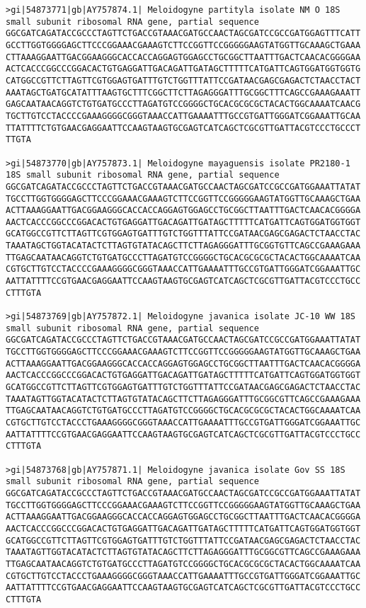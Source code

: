 \documentclass[11pt]{article}
\begin{document}
\begin{Verbatim}[commandchars=\\\{\}]
>gi|54873771|gb|AY757874.1| Meloidogyne partityla isolate NM O 18S small subunit ribosomal RNA gene, partial sequence
GGCGATCAGATACCGCCCTAGTTCTGACCGTAAACGATGCCAACTAGCGATCCGCCGATGGAGTTTCATT
GCCTTGGTGGGGAGCTTCCCGGAAACGAAAGTCTTCCGGTTCCGGGGGAAGTATGGTTGCAAAGCTGAAA
CTTAAAGGAATTGACGGAAGGGCACCACCAGGAGTGGAGCCTGCGGCTTAATTTGACTCAACACGGGGAA
ACTCACCCGGCCCGGACACTGTGAGGATTGACAGATTGATAGCTTTTTCATGATTCAGTGGATGGTGGTG
CATGGCCGTTCTTAGTTCGTGGAGTGATTTGTCTGGTTTATTCCGATAACGAGCGAGACTCTAACCTACT
AAATAGCTGATGCATATTTAAGTGCTTTCGGCTTCTTAGAGGGATTTGCGGCTTTCAGCCGAAAGAAATT
GAGCAATAACAGGTCTGTGATGCCCTTAGATGTCCGGGGCTGCACGCGCGCTACACTGGCAAAATCAACG
TGCTTGTCCTACCCCGAAAGGGGCGGGTAAACCATTGAAAATTTGCCGTGATTGGGATCGGAAATTGCAA
TTATTTTCTGTGAACGAGGAATTCCAAGTAAGTGCGAGTCATCAGCTCGCGTTGATTACGTCCCTGCCCT
TTGTA

>gi|54873770|gb|AY757873.1| Meloidogyne mayaguensis isolate PR2180-1 18S small subunit ribosomal RNA gene, partial sequence
GGCGATCAGATACCGCCCTAGTTCTGACCGTAAACGATGCCAACTAGCGATCCGCCGATGGAAATTATAT
TGCCTTGGTGGGGAGCTTCCCGGAAACGAAAGTCTTCCGGTTCCGGGGGAAGTATGGTTGCAAAGCTGAA
ACTTAAAGGAATTGACGGAAGGGCACCACCAGGAGTGGAGCCTGCGGCTTAATTTGACTCAACACGGGGA
AACTCACCCGGCCCGGACACTGTGAGGATTGACAGATTGATAGCTTTTTCATGATTCAGTGGATGGTGGT
GCATGGCCGTTCTTAGTTCGTGGAGTGATTTGTCTGGTTTATTCCGATAACGAGCGAGACTCTAACCTAC
TAAATAGCTGGTACATACTCTTAGTGTATACAGCTTCTTAGAGGGATTTGCGGTGTTCAGCCGAAAGAAA
TTGAGCAATAACAGGTCTGTGATGCCCTTAGATGTCCGGGGCTGCACGCGCGCTACACTGGCAAAATCAA
CGTGCTTGTCCTACCCCGAAAGGGGCGGGTAAACCATTGAAAATTTGCCGTGATTGGGATCGGAAATTGC
AATTATTTTCCGTGAACGAGGAATTCCAAGTAAGTGCGAGTCATCAGCTCGCGTTGATTACGTCCCTGCC
CTTTGTA

>gi|54873769|gb|AY757872.1| Meloidogyne javanica isolate JC-10 WW 18S small subunit ribosomal RNA gene, partial sequence
GGCGATCAGATACCGCCCTAGTTCTGACCGTAAACGATGCCAACTAGCGATCCGCCGATGGAAATTATAT
TGCCTTGGTGGGGAGCTTCCCGGAAACGAAAGTCTTCCGGTTCCGGGGGAAGTATGGTTGCAAAGCTGAA
ACTTAAAGGAATTGACGGAAGGGCACCACCAGGAGTGGAGCCTGCGGCTTAATTTGACTCAACACGGGGA
AACTCACCCGGCCCGGACACTGTGAGGATTGACAGATTGATAGCTTTTTCATGATTCAGTGGATGGTGGT
GCATGGCCGTTCTTAGTTCGTGGAGTGATTTGTCTGGTTTATTCCGATAACGAGCGAGACTCTAACCTAC
TAAATAGTTGGTACATACTCTTAGTGTATACAGCTTCTTAGAGGGATTTGCGGCGTTCAGCCGAAAGAAA
TTGAGCAATAACAGGTCTGTGATGCCCTTAGATGTCCGGGGCTGCACGCGCGCTACACTGGCAAAATCAA
CGTGCTTGTCCTACCCTGAAAGGGGCGGGTAAACCATTGAAAATTTGCCGTGATTGGGATCGGAAATTGC
AATTATTTTCCGTGAACGAGGAATTCCAAGTAAGTGCGAGTCATCAGCTCGCGTTGATTACGTCCCTGCC
CTTTGTA

>gi|54873768|gb|AY757871.1| Meloidogyne javanica isolate Gov SS 18S small subunit ribosomal RNA gene, partial sequence
GGCGATCAGATACCGCCCTAGTTCTGACCGTAAACGATGCCAACTAGCGATCCGCCGATGGAAATTATAT
TGCCTTGGTGGGGAGCTTCCCGGAAACGAAAGTCTTCCGGTTCCGGGGGAAGTATGGTTGCAAAGCTGAA
ACTTAAAGGAATTGACGGAAGGGCACCACCAGGAGTGGAGCCTGCGGCTTAATTTGACTCAACACGGGGA
AACTCACCCGGCCCGGACACTGTGAGGATTGACAGATTGATAGCTTTTTCATGATTCAGTGGATGGTGGT
GCATGGCCGTTCTTAGTTCGTGGAGTGATTTGTCTGGTTTATTCCGATAACGAGCGAGACTCTAACCTAC
TAAATAGTTGGTACATACTCTTAGTGTATACAGCTTCTTAGAGGGATTTGCGGCGTTCAGCCGAAAGAAA
TTGAGCAATAACAGGTCTGTGATGCCCTTAGATGTCCGGGGCTGCACGCGCGCTACACTGGCAAAATCAA
CGTGCTTGTCCTACCCTGAAAGGGGCGGGTAAACCATTGAAAATTTGCCGTGATTGGGATCGGAAATTGC
AATTATTTTCCGTGAACGAGGAATTCCAAGTAAGTGCGAGTCATCAGCTCGCGTTGATTACGTCCCTGCC
CTTTGTA


\end{Verbatim}
\end{document}
